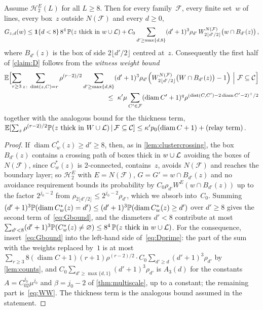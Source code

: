 \documentclass[11pt,letterpaper]{article}
\DeclareMathOperator{\diam}{diam}
\DeclareMathOperator{\dist}{dist}
\begin{document}
\begin{proposition}
\label{prop:reduceD}
Assume $\mathcal H^{E}_2(L)$ for all $L\ge8$. Then for every family~$\mathcal F$, every finite set~$w$ of lines, every box~$z$ outside $N(\mathcal F)$ and every $d\ge0$,
\begin{equation}
\label{eq:Gbound}
  G_{z,d}(w)\le\mathbf{1}\{d<8\}\,8^4\,\mathbb P(z\text{ thick in }w\cup\mathcal L)+C_0\sum_{d'\ge\max\{d,8\}}(d'+1)^3\rho_{d'}\,W^{N(\mathcal F)}_{2\lfloor d'/2\rfloor}\bigl(w\cap B_{d'}(z)\bigr)\,,
\end{equation}
where $B_{d'}(z)$ is the box of side $2\lfloor d'/2\rfloor$ centred at~$z$. Consequently the first half of \cref{claim:D} follows from the \emph{witness weight bound}
\begin{equation}
\label{eq:WW}
\begin{aligned}
  \E\Bigl[\sum_{r\ge3}\sum_{z\colon\dist(z,C)=r}\rho^{(r-2)/2}\sum_{d'\ge\max\{d,8\}}(d'+1)^3\rho_{d'}\Bigl(W^{N(\mathcal F)}_{2\lfloor d'/2\rfloor}\bigl(W\cap B_{d'}(z)\bigr)-1\Bigr)\ \Big\vert\ \mathcal F\subseteq\mathcal C\Bigr]\\
  \le\ \kappa'\mu\sum_{C'\in\mathcal F}(\diam C'+1)^{q}\rho^{(\dist(C,C')-2\diam C'-2)^+/2}
\end{aligned}
\end{equation}
together with the analogous bound for the thickness term, $\E[\sum_z\rho^{(r-2)/2}\P(z\text{ thick in }W\cup\cL)\,\vert\,\mathcal F\subseteq\mathcal C]\le\kappa'p_0(\diam C+1)+(\text{relay term})$.
\end{proposition}

\begin{proof}
If $\diam C^*_w(z)\ge d'\ge8$, then, as in \cref{lem:clustercrossing}, the box $B_{d'}(z)$ contains a crossing path of boxes thick in $w\cup\mathcal L$ avoiding the boxes of $N(\mathcal F)$, since $C^*_w(z)$ is $2$-connected, contains~$z$, avoids $N(\mathcal F)$ and reaches the boundary layer; so $\mathcal H^{E}_2$ with $E=N(\mathcal F)$, $G=G'=w\cap B_{d'}(z)$ and no avoidance requirement bounds its probability by $C_0\rho_{d'}W^{E}(w\cap B_{d'}(z))$ up to the factor $2^{j_0-2}$ from $\rho_{2\lfloor d'/2\rfloor}\le2^{j_0-2}\rho_{d'}$, which we absorb into~$C_0$. Summing $(d'+1)^3\P(\diam C^*_w(z)=d')\le(d'+1)^3\P(\diam C^*_w(z)\ge d')$ over $d'\ge8$ gives the second term of~\eqref{eq:Gbound}, and the diameters $d'<8$ contribute at most $\sum_{d'<8}(d'+1)^3\mathbb P(C^*_w(z)\neq\varnothing)\le8^4\,\mathbb P(z\text{ thick in }w\cup\mathcal L)$. For the consequence, insert~\eqref{eq:Gbound} into the left-hand side of~\eqref{eq:Dprime}: the part of the sum with the weights replaced by~$1$ is at most $\sum_{r\ge3}8(\diam C+1)(r+1)\rho^{(r-2)/2}\cdot C_0\sum_{d'\ge d}(d'+1)^3\rho_{d'}$ by \cref{lem:counts}, and $C_0\sum_{d'\ge\max\{d,1\}}(d'+1)^3\rho_{d'}$ is $A_3(d)$ for the constants $A=C_02^{j_0}\mu^{j_0}$ and $\beta=j_0-2$ of \cref{thm:multiscale}, up to a constant; the remaining part is~\eqref{eq:WW}. The thickness term is the analogous bound assumed in the statement.
\end{proof}
\end{document}
